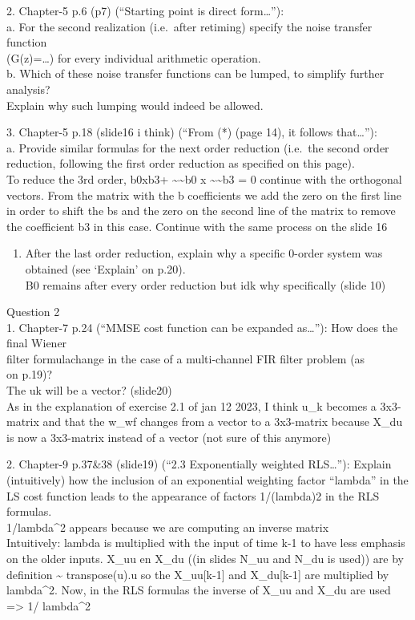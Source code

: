 \documentclass[
  a4paper,
  ,captions=tableheading
]{scrartcl}
\providecommand{\tightlist}{%
  \setlength{\itemsep}{0pt}\setlength{\parskip}{0pt}}
\begin{document}
2. Chapter-5 p.6 (p7) (``Starting point is direct form\ldots{}''):\\
a. For the second realization (i.e.~after retiming) specify the noise
transfer function\\
(G(z)=\ldots) for every individual arithmetic operation.\\
b. Which of these noise transfer functions can be lumped, to simplify
further analysis?\\
Explain why such lumping would indeed be allowed.

3. Chapter-5 p.18 (slide16 i think) (``From (*) (page 14), it follows
that\ldots{}''):\\
a. Provide similar formulas for the next order reduction (i.e.~the
second order\\
reduction, following the first order reduction as specified on this
page).\\
To reduce the 3rd order, b0xb3+ \textasciitilde\textasciitilde b0 x
\textasciitilde\textasciitilde b3 = 0 continue with the orthogonal
vectors. From the matrix with the b coefficients we add the zero on the
first line in order to shift the bs and the zero on the second line of
the matrix to remove the coefficient b3 in this case. Continue with the
same process on the slide 16

\begin{enumerate}
\def\labelenumi{\alph{enumi}.}
\setcounter{enumi}{1}
\tightlist
\item
  After the last order reduction, explain why a specific 0-order system
  was obtained (see `Explain' on p.20).\\
  B0 remains after every order reduction but idk why specifically (slide
  10)
\end{enumerate}

Question 2\\
1. Chapter-7 p.24 (``MMSE cost function can be expanded as\ldots{}''):
How does the final Wiener\\
filter formulachange in the case of a multi-channel FIR filter problem
(as\\
on p.19)?\\
The uk will be a vector? (slide20)\\
As in the explanation of exercise 2.1 of jan 12 2023, I think u\_k
becomes a 3x3-matrix and that the w\_wf changes from a vector to a
3x3-matrix because X\_du is now a 3x3-matrix instead of a vector (not
sure of this anymore)

2. Chapter-9 p.37\&38 (slide19) (``2.3 Exponentially weighted
RLS\ldots{}''): Explain (intuitively) how the inclusion of an
exponential weighting factor ``lambda'' in the LS cost function leads to
the appearance of factors 1/(lambda)2 in the RLS formulas.\\
1/lambda\^{}2 appears because we are computing an inverse matrix\\
Intuitively: lambda is multiplied with the input of time k-1 to have
less emphasis on the older inputs. X\_uu en X\_du ((in slides N\_uu and
N\_du is used)) are by definition \textasciitilde{} transpose(u).u so
the X\_uu{[}k-1{]} and X\_du{[}k-1{]} are multiplied by lambda\^{}2.
Now, in the RLS formulas the inverse of X\_uu and X\_du are used
=\textgreater{} 1/ lambda\^{}2
\end{document}
